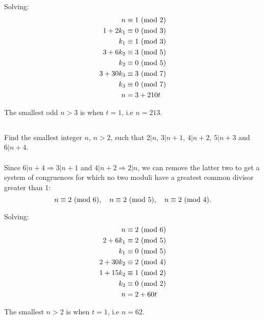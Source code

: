 \documentclass{article}
\begin{document}
Solving:
\begin{align*}
    n &\equiv 1 \ (\mathrm{mod}\ 2)\\
    1 + 2k_1 &\equiv 0 \ (\mathrm{mod}\ 3)\\
    k_1 &\equiv 1 \ (\mathrm{mod}\ 3)\\
    3 + 6k_2 &\equiv 3 \ (\mathrm{mod}\ 5)\\
    k_2 &\equiv 0 \ (\mathrm{mod}\ 5)\\
    3 + 30k_3 &\equiv 3 \ (\mathrm{mod}\ 7)\\
    k_3 &\equiv 0 \ (\mathrm{mod}\ 7)\\
    n &= 3 + 210t
\end{align*}

The smallest odd $n > 3$ is when $t = 1$, i.e $n = 213$.\\

\subsection{}
Find the smallest integer $n$, $n > 2$, such that $2|n$, $3|n + 1$,
$4|n + 2$, $5|n + 3$ and $6|n + 4$.\\~\\
Since $6|n + 4 \Rightarrow 3|n + 1$ and $4|n + 2 \Rightarrow 2|n$,
we can remove the latter two to get a system of congruences for which
no two moduli have a greatest common divisor greater than 1:
\begin{equation*}
    n \equiv 2 \ (\mathrm{mod}\ 6), \quad
    n \equiv 2 \ (\mathrm{mod}\ 5), \quad
    n \equiv 2 \ (\mathrm{mod}\ 4).
\end{equation*}

Solving:
\begin{align*}
    n &\equiv 2 \ (\mathrm{mod}\ 6)\\
    2 + 6k_1 &\equiv 2 \ (\mathrm{mod}\ 5)\\
    k_1 &\equiv 0 \ (\mathrm{mod}\ 5)\\
    2 + 30k_2 &\equiv 2 \ (\mathrm{mod}\ 4)\\
    1 + 15k_2 &\equiv 1 \ (\mathrm{mod}\ 2)\\
    k_2 &\equiv 0 \ (\mathrm{mod}\ 2)\\
    n &= 2 + 60t
\end{align*}

The smallest $n > 2$ is when $t = 1$, i.e $n = 62$.

\end{document}

